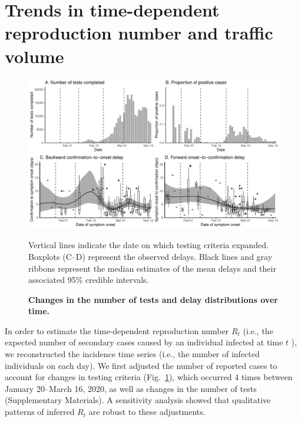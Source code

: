 \documentclass[12pt]{article}
\newcommand{\fref}[1]{Fig.~\ref{fig:#1}}
\begin{document}

\section{Trends in time-dependent reproduction number and traffic volume}

\begin{figure}[!ht]
\includegraphics[width=\textwidth]{figure_report_delay.pdf}
\caption{
\textbf{Changes in the number of tests and delay distributions over time.}
}
Vertical lines indicate the date on which testing criteria expanded.
Boxplots (C--D) represent the observed delays.
Black lines and gray ribbons represent the median estimates of the mean delays and their associated 95\% credible intervals.
\label{fig:dist}
\end{figure}

In order to estimate the time-dependent reproduction number $R_t$ (i.e., the expected number of secondary cases caused by an individual infected at time $t$ \citep{fraser2007estimating}), we reconstructed the incidence time series (i.e., the number of infected individuals on each day).
We first adjusted the number of reported cases to account for changes in testing criteria (\fref{dist}), which occurred 4 times between January 20--March 16, 2020, as well as changes in the number of tests (Supplementary Materials).
A sensitivity analysis showed that qualitative patterns of inferred $R_t$ are robust to these adjustments.
\end{document}
